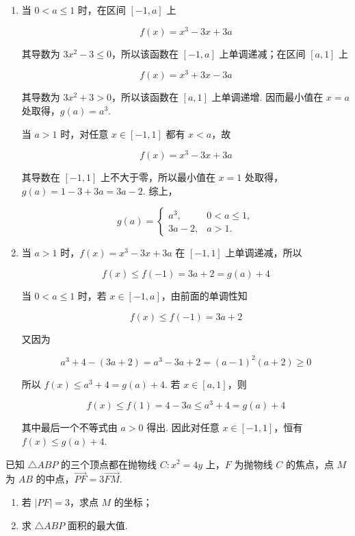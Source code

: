 \begin{solution}
\begin{enumerate}
\item 当 \(0<a\leqslant1\) 时，在区间 \([-1,a]\) 上

\[
f(x)=x^3-3x+3a
\]

其导数为 \(3x^2-3\leqslant0\)，所以该函数在 \([-1,a]\) 上单调递减；在区间 \([a,1]\) 上

\[
f(x)=x^3+3x-3a
\]

其导数为 \(3x^2+3>0\)，所以该函数在 \([a,1]\) 上单调递增. 因而最小值在 \(x=a\) 处取得，\(g(a)=a^3\).

当 \(a>1\) 时，对任意 \(x\in[-1,1]\) 都有 \(x<a\)，故

\[
f(x)=x^3-3x+3a
\]

其导数在 \([-1,1]\) 上不大于零，所以最小值在 \(x=1\) 处取得，\(g(a)=1-3+3a=3a-2\). 综上，

\[
g(a)=\begin{cases}
a^3,&0<a\leqslant1,\\
3a-2,&a>1.
\end{cases}
\]

\item 当 \(a>1\) 时，\(f(x)=x^3-3x+3a\) 在 \([-1,1]\) 上单调递减，所以

\[
f(x)\leqslant f(-1)=3a+2=g(a)+4
\]

当 \(0<a\leqslant1\) 时，若 \(x\in[-1,a]\)，由前面的单调性知

\[
f(x)\leqslant f(-1)=3a+2
\]

又因为

\[
a^3+4-(3a+2)=a^3-3a+2=(a-1)^2(a+2)\geqslant0
\]

所以 \(f(x)\leqslant a^3+4=g(a)+4\). 若 \(x\in[a,1]\)，则

\[
f(x)\leqslant f(1)=4-3a\leqslant a^3+4=g(a)+4
\]

其中最后一个不等式由 \(a>0\) 得出. 因此对任意 \(x\in[-1,1]\)，恒有 \(f(x)\leqslant g(a)+4\).
\end{enumerate}
\end{solution}

\begin{problem}
已知 \(\triangle ABP\) 的三个顶点都在抛物线 \(C: x^2 = 4y\) 上，\(F\) 为抛物线 \(C\) 的焦点，点 \(M\) 为 \(AB\) 的中点，\(\overrightarrow{PF} = 3\overrightarrow{FM}\).

\begin{enumerate}
\item 若 \(|PF| = 3\)，求点 \(M\) 的坐标；
\item 求 \(\triangle ABP\) 面积的最大值.
\end{enumerate}
\end{problem}

